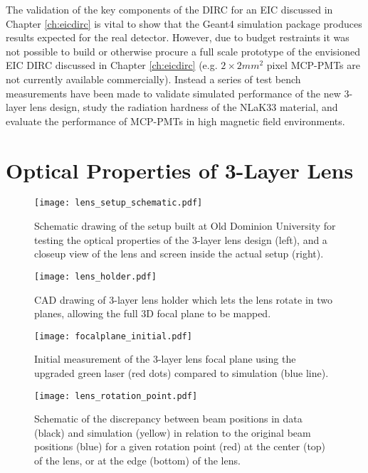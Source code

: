 \label{ch:components}
The validation of the key components of the DIRC for an EIC discussed in Chapter \ref{ch:eicdirc} is vital to show that the Geant4 simulation package produces results expected for the real detector. However, due to budget restraints it was not possible to build or otherwise procure a full scale prototype of the envisioned EIC DIRC discussed in Chapter \ref{ch:eicdirc} (e.g. $2\times2\unit{mm}^2$ pixel MCP-PMTs are not currently available commercially). Instead a series of test bench measurements have been made to validate simulated performance of the new 3-layer lens design, study the radiation hardness of the NLaK33 material, and evaluate the performance of MCP-PMTs in high magnetic field environments.

\section{Optical Properties of 3-Layer Lens}
\begin{figure}[ht]
	\centering
	\texttt{[image: lens\_setup\_schematic.pdf]}
	\caption{Schematic drawing of the setup built at Old Dominion University for testing the optical properties of the 3-layer lens design (left), and a closeup view of the lens and screen inside the actual setup (right).}
	\label{fig:ODU_setup}
\end{figure}

\begin{figure}[ht]
	\centering
	\texttt{[image: lens\_holder.pdf]}
	\caption{CAD drawing of 3-layer lens holder which lets the lens rotate in two planes, allowing the full 3D focal plane to be mapped.}
	\label{fig:lens_holder}
\end{figure}

\begin{figure}[ht]
	\centering
	\texttt{[image: focalplane\_initial.pdf]}
	\caption{Initial measurement of the 3-layer lens focal plane using the upgraded green laser (red dots) compared to simulation (blue line).}
	\label{fig:focalplane_initial}
\end{figure}

\begin{figure}[ht]
	\centering
	\texttt{[image: lens\_rotation\_point.pdf]}
	\caption{Schematic of the discrepancy between beam positions in data (black) and simulation (yellow) in relation to the original beam positions (blue) for a given rotation point (red) at the center (top) of the lens, or at the edge (bottom) of the lens. }
	\label{fig:lens_rotation_point}
\end{figure}

